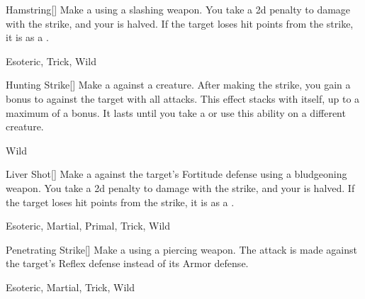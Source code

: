 \lowercase{\hypertarget{maneuver:Hamstring}{}}\label{maneuver:Hamstring}
\hypertarget{maneuver:Hamstring}{}
\begin{freeability}[Rank 1]{Hamstring}[]
Make a  using a slashing weapon.
You take a \minus2d penalty to damage with the strike, and your  is halved.
If the target loses hit points from the strike, it is  as a .


 Esoteric, Trick, Wild
\end{freeability}
\vspace{0.25em}



\lowercase{\hypertarget{maneuver:Hunting Strike}{}}\label{maneuver:Hunting Strike}
\hypertarget{maneuver:Hunting Strike}{}
\begin{freeability}[Rank 1]{Hunting Strike}[]
Make a  against a creature.
After making the strike, you gain a  bonus to  against the target with all attacks.
This effect stacks with itself, up to a maximum of a  bonus.
It lasts until you take a  or use this ability on a different creature.


 Wild
\end{freeability}
\vspace{0.25em}



\lowercase{\hypertarget{maneuver:Liver Shot}{}}\label{maneuver:Liver Shot}
\hypertarget{maneuver:Liver Shot}{}
\begin{freeability}[Rank 1]{Liver Shot}[]
Make a  against the target's Fortitude defense using a bludgeoning weapon.
You take a \minus2d penalty to damage with the strike, and your  is halved.
If the target loses hit points from the strike, it is  as a .


 Esoteric, Martial, Primal, Trick, Wild
\end{freeability}
\vspace{0.25em}



\lowercase{\hypertarget{maneuver:Penetrating Strike}{}}\label{maneuver:Penetrating Strike}
\hypertarget{maneuver:Penetrating Strike}{}
\begin{freeability}[Rank 1]{Penetrating Strike}[]
Make a  using a piercing weapon.
The attack is made against the target's Reflex defense instead of its Armor defense.


 Esoteric, Martial, Trick, Wild
\end{freeability}
\vspace{0.25em}



